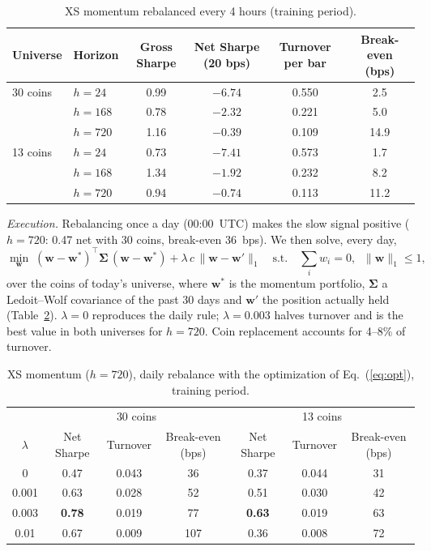 \documentclass[aps,prl,onecolumn,superscriptaddress,nofootinbib]{revtex4-2}
\begin{document}
	\begin{table}[!htbp]
		\caption{XS momentum rebalanced every 4 hours (training period).}
		\label{tab:costs}
		\begin{ruledtabular}
			\begin{tabular}{llcccc}
				Universe & Horizon & Gross Sharpe & Net Sharpe (20 bps) & Turnover per bar & Break-even (bps) \\
				\hline
				30 coins & $h = 24$  & 0.99 & $-6.74$ & 0.550 & 2.5 \\
				& $h = 168$ & 0.78 & $-2.32$ & 0.221 & 5.0 \\
				& $h = 720$ & 1.16 & $-0.39$ & 0.109 & 14.9 \\
				13 coins & $h = 24$  & 0.73 & $-7.41$ & 0.573 & 1.7 \\
				& $h = 168$ & 1.34 & $-1.92$ & 0.232 & 8.2 \\
				& $h = 720$ & 0.94 & $-0.74$ & 0.113 & 11.2 \\
			\end{tabular}
		\end{ruledtabular}
	\end{table}

	\textit{Execution.} Rebalancing once a day (00:00~UTC) makes the slow signal positive ($h = 720$: 0.47 net with 30 coins, break-even 36~bps). We then solve, every day,
	\begin{equation}
		\min_{\bm w}\; (\bm w - \bm w^{*})^{\top} \bm\Sigma\, (\bm w - \bm w^{*}) + \lambda\, c\, \lVert \bm w - \bm w' \rVert_1
		\quad \text{s.t.} \quad \textstyle\sum_i w_i = 0,\;\; \lVert \bm w \rVert_1 \le 1,
		\label{eq:opt}
	\end{equation}
	over the coins of today's universe, where $\bm w^{*}$ is the momentum portfolio, $\bm\Sigma$ a Ledoit--Wolf covariance of the past 30 days and $\bm w'$ the position actually held (Table~\ref{tab:opt}). $\lambda = 0$ reproduces the daily rule; $\lambda = 0.003$ halves turnover and is the best value in both universes for $h = 720$. Coin replacement accounts for 4--8\% of turnover.

	\begin{table}[!htbp]
		\caption{XS momentum ($h = 720$), daily rebalance with the optimization of Eq.~(\ref{eq:opt}), training period.}
		\label{tab:opt}
		\begin{ruledtabular}
			\begin{tabular}{ccccccc}
				& \multicolumn{3}{c}{30 coins} & \multicolumn{3}{c}{13 coins} \\
				$\lambda$ & Net Sharpe & Turnover & Break-even (bps) & Net Sharpe & Turnover & Break-even (bps) \\
				\hline
				0     & 0.47 & 0.043 & 36  & 0.37 & 0.044 & 31 \\
				0.001 & 0.63 & 0.028 & 52  & 0.51 & 0.030 & 42 \\
				0.003 & \textbf{0.78} & 0.019 & 77  & \textbf{0.63} & 0.019 & 63 \\
				0.01  & 0.67 & 0.009 & 107 & 0.36 & 0.008 & 72 \\
			\end{tabular}
		\end{ruledtabular}
	\end{table}
\end{document}
